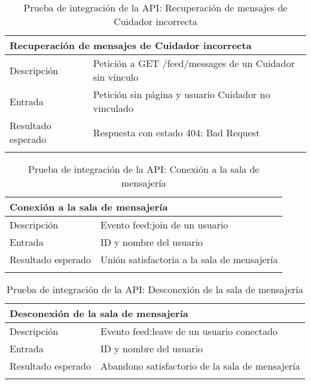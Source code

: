 \begin{longtable}{|p{} p{}|}
    \hline
    \multicolumn{2}{|l|}{\textbf{Recuperación de mensajes de Cuidador incorrecta}} \\ \hline 
    Descripción                 & Petición a GET /feed/messages de un Cuidador sin vínculo \\ \hline
    Entrada                     & Petición sin página y usuario Cuidador no vinculado \\ \hline
    Resultado esperado          & Respuesta con estado 404: Bad Request \\ \hline
    \caption{Prueba de integración de la API: Recuperación de mensajes de Cuidador incorrecta}
    \label{cp:i:api:recuperacion_mensajes_cuidador_incorrecta}
\end{longtable}

\begin{longtable}{|p{} p{}|}
    \hline
    \multicolumn{2}{|l|}{\textbf{Conexión a la sala de mensajería}} \\ \hline 
    Descripción                 & Evento feed:join de un usuario \\ \hline
    Entrada                     & ID y nombre del usuario \\ \hline
    Resultado esperado          & Unión satisfactoria a la sala de mensajería \\ \hline
    \caption{Prueba de integración de la API: Conexión a la sala de mensajería}
    \label{cp:i:api:conexion_sala_mensajeria}
\end{longtable}

\begin{longtable}{|p{} p{}|}
    \hline
    \multicolumn{2}{|l|}{\textbf{Desconexión de la sala de mensajería}} \\ \hline 
    Descripción                 & Evento feed:leave de un usuario conectado \\ \hline
    Entrada                     & ID y nombre del usuario \\ \hline
    Resultado esperado          & Abandono satisfactorio de la sala de mensajería \\ \hline
    \caption{Prueba de integración de la API: Desconexión de la sala de mensajería}
    \label{cp:i:api:desconexion_sala_mensajeria}
\end{longtable}

